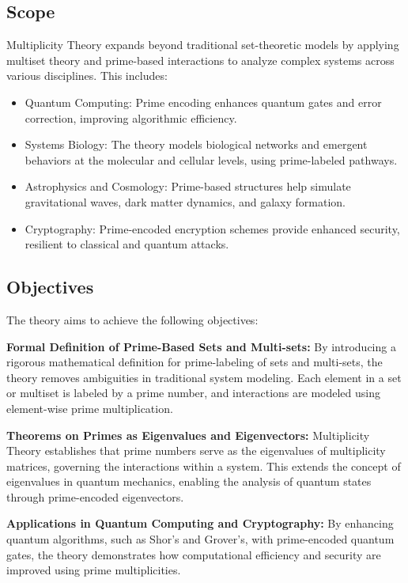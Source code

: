 \documentclass[%
 preprint, linenumbers,
 amsmath,amssymb,
 aps, physrev,
]{revtex4-2}
\begin{document}
\subsection{Scope} Multiplicity Theory expands beyond traditional set-theoretic models by applying multiset theory and prime-based interactions to analyze complex systems across various disciplines. This includes:

\begin{itemize} \item Quantum Computing: Prime encoding enhances quantum gates and error correction, improving algorithmic efficiency. \item Systems Biology: The theory models biological networks and emergent behaviors at the molecular and cellular levels, using prime-labeled pathways. \item Astrophysics and Cosmology: Prime-based structures help simulate gravitational waves, dark matter dynamics, and galaxy formation. \item Cryptography: Prime-encoded encryption schemes provide enhanced security, resilient to classical and quantum attacks. \end{itemize}

\subsection{Objectives} The theory aims to achieve the following objectives:

\textbf{Formal Definition of Prime-Based Sets and Multi-sets:} By introducing a rigorous mathematical definition for prime-labeling of sets and multi-sets, the theory removes ambiguities in traditional system modeling. Each element in a set or multiset is labeled by a prime number, and interactions are modeled using element-wise prime multiplication.

\textbf{Theorems on Primes as Eigenvalues and Eigenvectors:} Multiplicity Theory establishes that prime numbers serve as the eigenvalues of multiplicity matrices, governing the interactions within a system. This extends the concept of eigenvalues in quantum mechanics, enabling the analysis of quantum states through prime-encoded eigenvectors.

\textbf{Applications in Quantum Computing and Cryptography:} By enhancing quantum algorithms, such as Shor's and Grover's, with prime-encoded quantum gates, the theory demonstrates how computational efficiency and security are improved using prime multiplicities.
\end{document}
